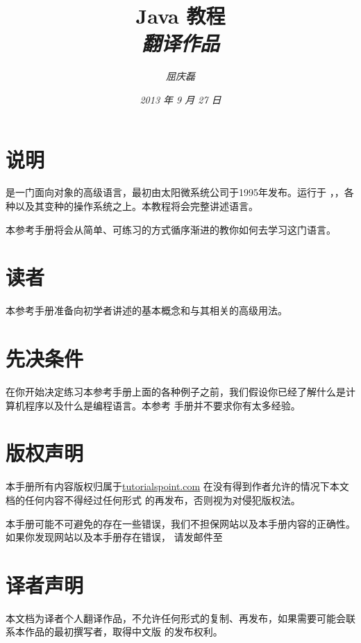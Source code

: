 \documentclass{article}
\begin{document}
\title{%
  {\huge \textsf{Java 教程}\\\smallskip}%
  {\small \textit{翻译作品}}
}

\author{\textit{屈庆磊}\\[2mm]
       }

\date{\textit{2013 年 9 月 27 日}}

\maketitle
\begin{multicols}{2}
\tableofcontents
\end{multicols}

\section{说明}
 是一门面向对象的高级语言，最初由太阳微系统公司于1995年发布。运行于
，，各种以及其变种的操作系统之上。本教程将会完整讲述语言。

本参考手册将会从简单、可练习的方式循序渐进的教你如何去学习这门语言。

\section{读者}
本参考手册准备向初学者讲述的基本概念和与其相关的高级用法。

\section{先决条件}
在你开始决定练习本参考手册上面的各种例子之前，我们假设你已经了解什么是计算机程序以及什么是编程语言。本参考
手册并不要求你有太多经验。

\section{版权声明}
本手册所有内容版权归属于\url{tutorialspoint.com} 在没有得到作者允许的情况下本文档的任何内容不得经过任何形式
的再发布，否则视为对侵犯版权法。

本手册可能不可避免的存在一些错误，我们不担保网站以及本手册内容的正确性。如果你发现网站以及本手册存在错误，
请发邮件至

\section{译者声明}
本文档为译者个人翻译作品，不允许任何形式的复制、再发布，如果需要可能会联系本作品的最初撰写者，取得中文版
的发布权利。
\end{document}
